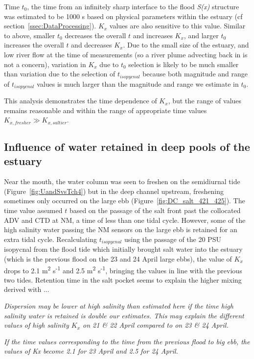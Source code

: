 Time $t_0$, the time from an infinitely sharp interface to the flood \emph{S(x)} structure was estimated to be 1000 s based on physical parameters within the estuary (cf section~\ref{ssec:DataProcessing}). $K_x$ values are also sensitive to this value. Similar to above, smaller $t_0$ decreases the overall $t$ and increases $K_x$, and larger $t_0$ increases the overall $t$ and decreases $K_x$. Due to the small size of the estuary, and low river flow at the time of measurements (so a river plume advecting back in is not a concern), variation in $K_x$ due to $t_0$ selection is likely to be much smaller than variation due to the selection of $t_{isopycnal}$ because both magnitude and range of $t_{isopycnal}$ values is much larger than the magnitude and range we estimate in  $t_0$.

This analysis demonstrates the time dependence of $K_x$, but the range of values remains reasonable and within the range of appropriate time values $K_{x,fresher}\gg K_{x,saltier}$. 

\subsection{Influence of water retained in deep pools of the estuary}
Near the mouth, the water column was seen to freshen on the semidiurnal tide (Figure~\ref{fig:UandSvsTch4}) but in the deep channel upstream, freshening sometimes only occurred on the large ebb (Figure~\ref{fig:DC_salt_421_425}). The time value assumed $t$ based on the passage of the salt front past the collocated ADV and CTD at NM, a time of less than one tidal cycle. However, some of the high salinity water passing the NM sensors on the large ebb is retained for an extra tidal cycle. Recalculating $t_{isopycnal}$ using the passage of the 20 PSU isopycnal from the flood tide which initially brought salt water into the estuary (which is the previous flood on the 23 and 24 April large ebbs), the value of $K_x$ drops to 2.1 m\textsuperscript{2} s\textsuperscript{-1} and 2.5 m\textsuperscript{2} s\textsuperscript{-1}, bringing the values in line with the previous two tides. Retention time in the salt pocket seems to explain the higher mixing derived with ... 

\emph{Dispersion may be lower at high salinity than estimated here if the time high salinity water is retained is double our estimates. This may explain the different values of high salinity $K_x$ on 21 \& 22 April compared to on 23 \& 24 April.} 

\emph{If the time values corresponding to the time from the previous flood to \emph{big} ebb, the values of Kx become 2.1 for 23 April and 2.5 for 24 April.}

